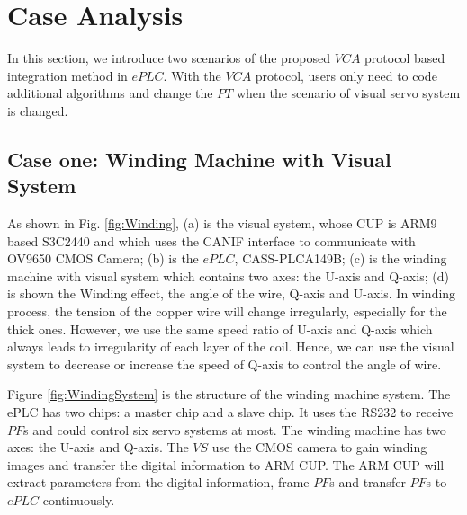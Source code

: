 \documentclass[journal,UTF8]{IEEEtran}
\begin{document}
\section{Case Analysis}
\label{Case}
In this section, we introduce two scenarios of the proposed $VCA$ protocol based integration method in $ePLC$. With the $VCA$ protocol, users only need to code additional algorithms and change the $PT$ when the scenario of visual servo system is changed. 

\subsection{Case one: Winding Machine with Visual System}
  
As shown in Fig. \ref{fig:Winding}, (a) is the visual system, whose CUP is ARM9 based S3C2440 and which uses the CANIF interface to communicate with OV9650 CMOS Camera; (b) is the $ePLC$, CASS-PLCA149B; (c) is the winding machine with visual system which contains two axes: the U-axis and Q-axis; (d) is shown the Winding effect, the angle of the wire, Q-axis and U-axis. In winding process, the tension of the copper wire will change irregularly, especially for the thick ones. However, we use the same speed ratio of U-axis and Q-axis which always leads to irregularity of each layer of the coil. Hence, we can use the visual system to decrease or increase the speed of Q-axis to control the angle of wire. 

Figure \ref{fig:WindingSystem} is the structure of the winding machine system. The ePLC has two chips: a master chip and a slave chip. It uses the RS232 to receive $PF$s and could control six servo systems at most. The winding machine has two axes: the U-axis and Q-axis. The $VS$ use the CMOS camera to gain winding images and transfer the digital information to ARM CUP. The ARM CUP will extract parameters from the digital information, frame $PF$s and transfer $PF$s to $ePLC$ continuously. 
\end{document}
